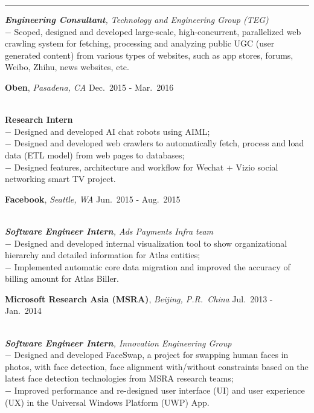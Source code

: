 \documentclass[a4paper,10pt]{article}
\newcommand{\shadedsection}[1]{
    \setlength{\fboxsep}{0pt}
    \colorbox{shadecolor}{%
        \begin{minipage}{\linewidth}%
            \vspace{0.2em}%
            #1%
        \end{minipage}%
    }
}
\newenvironment{rSection}[1]{ %
  \medskip
  \hspace{-1.5em}{\color{Blue}\MakeUppercase{\large \bf {#1}}} %
  \vspace{-0.2em}
  \medskip
  \hrule %
  \begin{list}{}{ %
    \setlength{\leftmargin}{1.5em} %
  }
\setlength{\itemsep}{1pt}
  \item[]
}{
  \end{list}
}
\newcommand{\detail}[1]{{$-$ {#1}}}
\newcommand{\period}[3]{\normalsize {#1} \hfill {#2} - {#3}}
\begin{document}
\begin{rSection}{Experience}
    {\em {\bf Engineering Consultant}, Technology and Engineering Group (TEG)}\\
    \detail{Scoped, designed and developed large-scale, high-concurrent, parallelized web crawling system for fetching, processing and analyzing public UGC (user generated content) from various types of websites, such as app stores, forums, Weibo, Zhihu, news websites, etc.}
  \item
    \shadedsection{\period{{\bf Oben}, {\em Pasadena, CA}}{Dec.~2015}{Mar.~2016}}\\
    {\bf Research Intern}\\
    \detail{Designed and developed AI chat robots using AIML;}\\
    \detail{Designed and developed web crawlers to automatically fetch, process and load data (ETL model) from web pages to databases;}\\
    \detail{Designed features, architecture and workflow for Wechat + Vizio social networking smart TV project.}
  \item
    \shadedsection{\period{{\bf Facebook}, {\em Seattle, WA}}{Jun.~2015}{Aug.~2015}}\\
    {\em {\bf Software Engineer Intern}, Ads Payments Infra team}\\
    \detail{Designed and developed internal visualization tool to show organizational hierarchy and detailed information for Atlas entities;}\\
    \detail{Implemented automatic core data migration and improved the accuracy of billing amount for Atlas Biller.}
  \item
    \shadedsection{\period{{\bf Microsoft Research Asia (MSRA)}, {\em Beijing, P.R.~China}}{Jul.~2013}{Jan.~2014}}\\
    {\em {\bf Software Engineer Intern}, Innovation Engineering Group}\\
    \detail{Designed and developed FaceSwap, a project for swapping human faces in photos, with face detection, face alignment with/without constraints based on the latest face detection technologies from MSRA research teams;}\\
    \detail{Improved performance and re-designed user interface (UI) and user experience (UX) in the Universal Windows Platform (UWP) App.}
\end{rSection}

\vspace{-0.5em}
\end{document}
